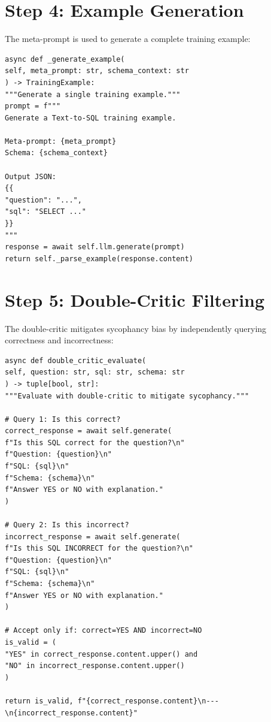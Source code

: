 \documentclass[12pt,a4paper,twoside]{report}
\begin{document}
\section{Step 4: Example Generation}

The meta-prompt is used to generate a complete training example:

\begin{lstlisting}[language=jsonx,caption={Example generation}]
async def _generate_example(
self, meta_prompt: str, schema_context: str
) -> TrainingExample:
"""Generate a single training example."""
prompt = f"""
Generate a Text-to-SQL training example.

Meta-prompt: {meta_prompt}
Schema: {schema_context}

Output JSON:
{{
"question": "...",
"sql": "SELECT ..."
}}
"""
response = await self.llm.generate(prompt)
return self._parse_example(response.content)
\end{lstlisting}

\section{Step 5: Double-Critic Filtering}

The double-critic mitigates sycophancy bias by independently querying correctness
and incorrectness:

\begin{lstlisting}[language=jsonx,caption={Double-critic evaluation (simula\_llm\_client.py, lines 180--220)}]
async def double_critic_evaluate(
self, question: str, sql: str, schema: str
) -> tuple[bool, str]:
"""Evaluate with double-critic to mitigate sycophancy."""

# Query 1: Is this correct?
correct_response = await self.generate(
f"Is this SQL correct for the question?\n"
f"Question: {question}\n"
f"SQL: {sql}\n"
f"Schema: {schema}\n"
f"Answer YES or NO with explanation."
)

# Query 2: Is this incorrect?
incorrect_response = await self.generate(
f"Is this SQL INCORRECT for the question?\n"
f"Question: {question}\n"
f"SQL: {sql}\n"
f"Schema: {schema}\n"
f"Answer YES or NO with explanation."
)

# Accept only if: correct=YES AND incorrect=NO
is_valid = (
"YES" in correct_response.content.upper() and
"NO" in incorrect_response.content.upper()
)

return is_valid, f"{correct_response.content}\n---\n{incorrect_response.content}"
\end{lstlisting}
\end{document}
